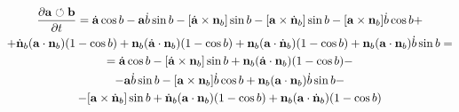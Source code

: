 \begin{multline}
\frac{\partial {\bf a}\circlearrowleft{\bf b}}{\partial t} = \dot{{\bf a}} \cos b - {\bf a}\dot b \sin b 
- [\dot{{\bf a}}\times{\bf n}_b] \sin b - [{\bf a}\times\dot{{\bf n}}_b] \sin b  - [{\bf a}\times{\bf n}_b] \dot b\cos b 
+\\+ \dot{{\bf n}}_b ({\bf a} \cdot {\bf n}_b)(1-\cos b) + {\bf n}_b (\dot{{\bf a}} \cdot {\bf n}_b)(1-\cos b) + {\bf n}_b ({\bf a} \cdot \dot{{\bf n}}_b)(1-\cos b) 
+ {\bf n}_b ({\bf a} \cdot {\bf n}_b)\dot b \sin b 
=\\=
\dot{{\bf a}} \cos b - [\dot{{\bf a}}\times{\bf n}_b] \sin b + {\bf n}_b (\dot{{\bf a}} \cdot {\bf n}_b)(1-\cos b)  
-\\- 
{\bf a}\dot b \sin b - [{\bf a}\times{\bf n}_b] \dot b\cos b + {\bf n}_b ({\bf a} \cdot {\bf n}_b)\dot b \sin b 
-\\- [{\bf a}\times\dot{{\bf n}}_b] \sin b   
+ \dot{{\bf n}}_b ({\bf a} \cdot {\bf n}_b)(1-\cos b)  + {\bf n}_b ({\bf a} \cdot \dot{{\bf n}}_b)(1-\cos b) 
\end{multline}






